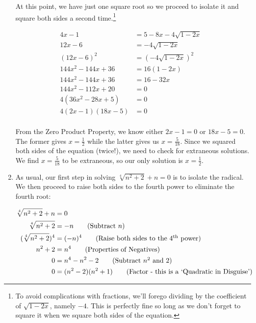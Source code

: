 \begin{ex}
\begin{enumerate}
At this point, we have just one square root so we proceed to isolate it and square both sides a second time.\footnote{To avoid complications with fractions, we'll forego dividing by the coefficient of $\sqrt{1-2x}$, namely $-4$. This is perfectly fine so long as we don't forget to square it when we square both sides of the equation.}

\begin{align*}
4x - 1 & = 5 - 8x - 4\sqrt{1-2x} &  \\ 
12x - 6 & = -4\sqrt{1-2x} \tag{Subtract $5$, add $8x$}\\ 
(12x-6)^2 & = (-4\sqrt{1-2x})^2 \tag{Square both sides} \\
144x^2 - 144x + 36 & = 16(1-2x) & \\ 
144x^2 -  144x + 36 & = 16 - 32x & \\
144x^2 - 112x + 20 & = 0 \tag{Subtract $16$, add $32x$} \\
4(36x^2 - 28x + 5) & = 0 \tag{Factor} \\
4(2x-1)(18x - 5) & = 0 \tag{Factor some more} \\
\end{align*}

From the Zero Product Property, we know either $2x-1 = 0$ or $18x - 5 = 0$.  The former gives $x = \frac{1}{2}$ while the latter gives us $x = \frac{5}{18}$.  Since we squared both sides of the equation (twice!), we need to check for extraneous solutions.  We find $x = \frac{5}{18}$ to be extraneous, so our only solution is $x = \frac{1}{2}$.

\item As usual, our first step in solving $\sqrt[4]{n^2 + 2} + n = 0$ is to isolate the radical.  We then proceed to raise both sides to the fourth power to eliminate the fourth root:

\begin{align*}
\sqrt[4]{n^2 + 2} + n & = 0 &  \\
\sqrt[4]{n^2 + 2} & =  -n \tag{Subtract $n$} \\
(\sqrt[4]{n^2 + 2})^4 & = (-n)^4 \tag{Raise both sides to the $4^{\text{th}}$ power} \\
n^2 + 2 & = n^4 \tag{Properties of Negatives}\\
0 & = n^{4} - n^2 - 2 \tag{Subtract $n^2$ and $2$} \\
0 & = (n^2 - 2)(n^2 + 1) \tag{Factor - this is a `Quadratic in Disguise'} \\
\end{align*}


\end{enumerate}
\end{ex}
